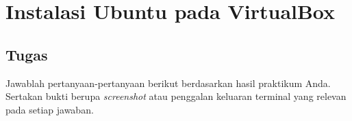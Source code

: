 
\chapter{Instalasi Ubuntu pada VirtualBox}
\label{chap:handson-01}

\section{Tugas}

Jawablah pertanyaan-pertanyaan berikut berdasarkan hasil praktikum Anda.
Sertakan bukti berupa \textit{screenshot} atau penggalan keluaran terminal
yang relevan pada setiap jawaban.


